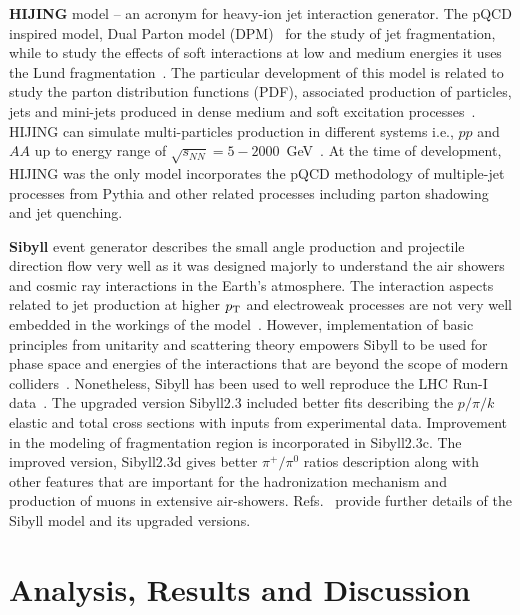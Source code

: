 \documentclass{article}
\newcommand{\ppt}{$p_{\rm T}$}
\begin{document}
{\bf HIJING} model -- an acronym for heavy-ion jet interaction generator. The pQCD inspired model, Dual Parton model (DPM)~\cite{Capella:1979fm} for the study of jet fragmentation, while to study the effects of soft interactions at low and medium energies it uses the Lund fragmentation~\cite{Andersson:2001yu}. The particular development of this model is related to study the parton distribution functions (PDF), associated production of particles, jets and mini-jets produced in dense medium and soft excitation processes~\cite{Wang:1991hta}. HIJING can simulate multi-particles production in different systems i.e., $pp$ and $AA$ up to energy range of $\sqrt{s_{NN}}= 5-2000 $~GeV~\cite{Capella:1979fm, Wang:1991hta}. At the time of development, HIJING was the only model incorporates the pQCD methodology of multiple-jet processes from Pythia and other related processes including parton shadowing and jet quenching.  


{ \bf Sibyll} event generator describes the small angle production and projectile direction flow very well as it was designed majorly to understand the air showers and cosmic ray interactions in the Earth’s atmosphere. The interaction aspects related to jet production at higher {\ppt} and electroweak processes are not very well embedded in the workings of the model~\cite{Riehn:2019jet}. However, implementation of basic principles from unitarity and scattering theory empowers Sibyll to be used for phase space and energies of the interactions that are beyond the scope of modern colliders~\cite{Riehn:2017mfm}. Nonetheless, Sibyll has been used to well reproduce the LHC Run-I data~\cite{Riehn:2019jet}. The upgraded version Sibyll2.3 included better fits describing the $p/\pi/k$ elastic and total cross sections with inputs from experimental data. Improvement in the modeling of fragmentation region is incorporated in Sibyll2.3c. The improved version, Sibyll2.3d gives better $\pi^{+}/\pi^{0}$ ratios description along with other features that are important for the hadronization mechanism and production of muons in extensive air-showers. Refs.~\cite{Riehn:2019jet, Riehn:2017mfm, CMS:2015zrm} provide further details of the Sibyll model and its upgraded versions. 



\section{Analysis, Results and Discussion}\label{sec3}
\end{document}
